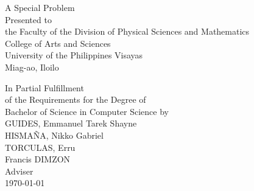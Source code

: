 \begin{titlepage}
\centering


\vspace{1.75cm}
A Special Problem\\
Presented to\\
the Faculty of the Division of Physical Sciences and Mathematics\\
College of Arts and Sciences\\
University of the Philippines Visayas\\
Miag-ao, Iloilo

\vspace{1.75cm}
In Partial Fulfillment\\
of the Requirements for the Degree of\\
Bachelor of Science in Computer Science
\vspace{1.75cm}
by\\

\vspace{1cm}
GUIDES, Emmanuel Tarek Shayne \\
HISMAÑA, Nikko Gabriel \\
TORCULAS, Erru \\

\vspace{1.75cm}
Francis DIMZON\\
Adviser\\

\vspace{1.75cm}
\today
\end{titlepage}
